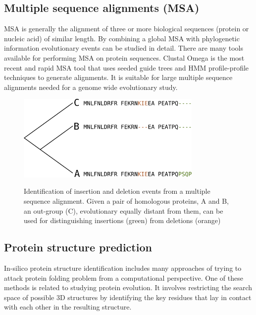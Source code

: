 \documentclass[11pt, a4paper,oneside]{report}
\begin{document}
\subsection{Multiple sequence alignments (MSA)}
 MSA is generally the alignment of three or more biological sequences (protein or nucleic acid) of similar length. By combining a global MSA with phylogenetic information evolutionary events can be studied in detail. There are many tools available for performing MSA on protein sequences. Clustal Omega is the most recent and rapid MSA tool\cite{Sievers2011} that uses seeded guide trees and HMM profile-profile techniques to generate alignments. It is suitable for large multiple sequence alignments needed for a genome wide evolutionary study. 

\begin{figure}[t]
\begin{center}
\label{img:populations}
\includegraphics[width=0.8\textwidth]{figures/indel.png}
\end{center}
\caption{Identification of insertion and deletion events from a multiple sequence alignment. Given a pair of homologous proteins, A and B, an out-group (C), evolutionary equally distant from them, can be used for distinguishing insertions (green) from deletions (orange)} 
\end{figure}

\subsection{Protein structure prediction}
In-silico protein structure identification includes many approaches of trying to attack protein folding problem from a computational perspective. One of these methods is  related to studying protein evolution. It involves restricting the search space of possible 3D structures by identifying the key residues that lay in contact with each other in the resulting structure. 
\end{document}
